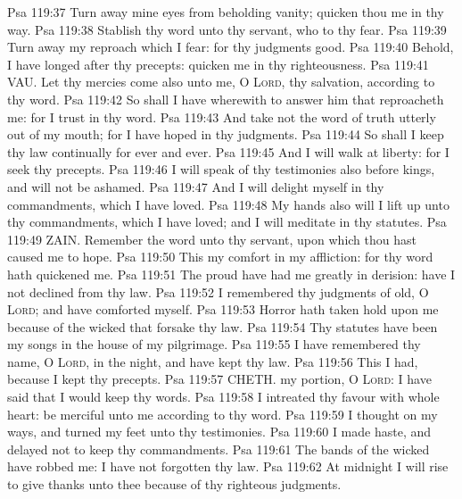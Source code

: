 \vs Psa 119:37 Turn away mine eyes from beholding vanity;  quicken thou me in thy way.
\vs Psa 119:38 Stablish thy word unto thy servant, who  to thy fear.
\vs Psa 119:39 Turn away my reproach which I fear: for thy judgments  good.
\vs Psa 119:40 Behold, I have longed after thy precepts: quicken me in thy righteousness.
\vs Psa 119:41 VAU. Let thy mercies come also unto me, O \textsc{Lord},  thy salvation, according to thy word.
\vs Psa 119:42 So shall I have wherewith to answer him that reproacheth me: for I trust in thy word.
\vs Psa 119:43 And take not the word of truth utterly out of my mouth; for I have hoped in thy judgments.
\vs Psa 119:44 So shall I keep thy law continually for ever and ever.
\vs Psa 119:45 And I will walk at liberty: for I seek thy precepts.
\vs Psa 119:46 I will speak of thy testimonies also before kings, and will not be ashamed.
\vs Psa 119:47 And I will delight myself in thy commandments, which I have loved.
\vs Psa 119:48 My hands also will I lift up unto thy commandments, which I have loved; and I will meditate in thy statutes.
\vs Psa 119:49 ZAIN. Remember the word unto thy servant, upon which thou hast caused me to hope.
\vs Psa 119:50 This  my comfort in my affliction: for thy word hath quickened me.
\vs Psa 119:51 The proud have had me greatly in derision:  have I not declined from thy law.
\vs Psa 119:52 I remembered thy judgments of old, O \textsc{Lord}; and have comforted myself.
\vs Psa 119:53 Horror hath taken hold upon me because of the wicked that forsake thy law.
\vs Psa 119:54 Thy statutes have been my songs in the house of my pilgrimage.
\vs Psa 119:55 I have remembered thy name, O \textsc{Lord}, in the night, and have kept thy law.
\vs Psa 119:56 This I had, because I kept thy precepts.
\vs Psa 119:57 CHETH.  my portion, O \textsc{Lord}: I have said that I would keep thy words.
\vs Psa 119:58 I intreated thy favour with  whole heart: be merciful unto me according to thy word.
\vs Psa 119:59 I thought on my ways, and turned my feet unto thy testimonies.
\vs Psa 119:60 I made haste, and delayed not to keep thy commandments.
\vs Psa 119:61 The bands of the wicked have robbed me:  I have not forgotten thy law.
\vs Psa 119:62 At midnight I will rise to give thanks unto thee because of thy righteous judgments.
